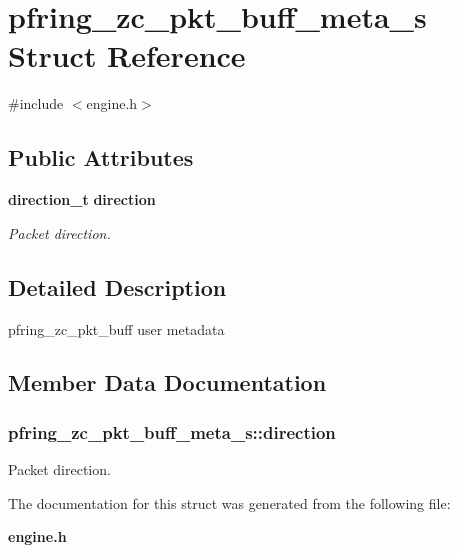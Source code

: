 \section{pfring\_zc\_pkt\_buff\_meta\_s Struct Reference}
\label{structpfring__zc__pkt__buff__meta__s}


{\ttfamily \#include $<$engine.\+h$>$}

\subsection*{Public Attributes}
\begin{DoxyCompactItemize}
\item 
{\bf direction\_t} {\bf direction}
\begin{DoxyCompactList}\small\item\em Packet direction. \end{DoxyCompactList}\end{DoxyCompactItemize}


\subsection{Detailed Description}
pfring\_zc\_pkt\_buff user metadata 

\subsection{Member Data Documentation}
\subsubsection[{direction}]{ pfring\_zc\_pkt\_buff\_meta\_s\+::direction}\label{structpfring__zc__pkt__buff__meta__s_a1ecea60e20e8ee0ff0fff4834e013a11}


Packet direction. 



The documentation for this struct was generated from the following file\+:\begin{DoxyCompactItemize}
\item 
{\bf engine.\+h}\end{DoxyCompactItemize}
